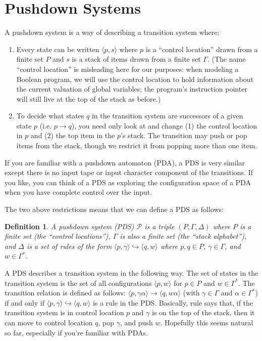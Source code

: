 \documentclass{article}
\newcommand{\Config}[2]{\ensuremath{\langle #1, #2 \rangle}}
\newcommand{\Rule}[2]{\ensuremath{#1 \hookrightarrow #2}}
\newtheorem{definition}{Definition}
\begin{document}
\section{Pushdown Systems}

A pushdown system is a way of describing a transition system where:
\begin{enumerate}

\item Every state can be written \Config{p}{s} where $p$ is a
  ``control location'' drawn from a finite set $P$ and $s$ is a stack
  of items drawn from a finite set $\Gamma$. (The name ``control
  location'' is misleading here for our purposes: when modeling a
  Boolean program, we will use the control location to hold
  information about the current valuation of global variables; the
  program's instruction pointer will still live at the top of the
  stack as before.)

\item To decide what states $q$ in the transition system are
  successors of a given state $p$ (i.e. $p \rightarrow q$), you need
  only look at and change (1) the control location in $p$ and (2) the
  top item in the $p$'s stack. The transition may push or pop items
  from the stack, though we restrict it from popping more than one
  item.
\end{enumerate}

If you are familiar with a pushdown automaton (PDA), a PDS is very
similar except there is no input tape or input character component of
the transitions. If you like, you can think of a PDS as exploring the
configuration space of a PDA when you have complete control over the
input.

The two above restrictions means that we can define a PDS as follows:

\begin{definition}
  A pushdown system (PDS) $\mathcal{P}$ is a triple $(P, \Gamma,
  \Delta)$ where $P$ is a finite set (the ``control locations''),
  $\Gamma$ is also a finite set (the ``stack alphabet''), and $\Delta$
  is a set of rules of the form
  \Rule{\Config{p}{\gamma}}{\Config{q}{w}} where $p, q \in P$, $\gamma
  \in \Gamma$, and $w \in \Gamma^*$.
\end{definition}

A PDS describes a transition system in the following way. The set of
states in the transition system is the set of all configurations
\Config{p}{w} for $p \in P$ and $w \in \Gamma^*$. The transition
relation is defined as follows: $\Config{p}{\gamma\alpha} \rightarrow
\Config{q}{w\alpha}$ (with $\gamma \in \Gamma$ and $\alpha \in
\Gamma^*$) if and only if $\Rule{\Config{p}{\gamma}}{\Config{q}{w}}$
is a rule in the PDS. Basically, rule says that, if the transition
system is in control location $p$ and $\gamma$ is on the top of the
stack, then it can move to control location $q$, pop $\gamma$, and
push $w$. Hopefully this seems natural so far, especially if you're
familiar with PDAs.
\end{document}

